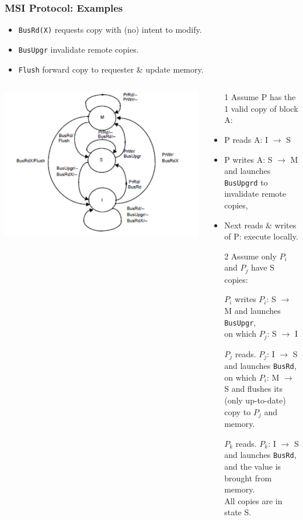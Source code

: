 \documentclass{beamer}
\renewcommand{\emph}[1]{\textcolor{structure}{#1}}
\begin{document}
\begin{frame}[fragile,t]
\frametitle{MSI Protocol: Examples}

\begin{itemize}
    \item \emph{\tt BusRd(X)} requests copy with (no) intent to modify.
    \item \emph{\tt BusUpgr} invalidate remote copies.  
    \item \emph{\tt Flush} forward copy to requester \& update memory.
\end{itemize} 


\begin{columns}\hspace{-7ex}
\includegraphics[width=40ex]{FigsInfCoherence/MSI}
\begin{scriptsize}
\begin{itemize}
    \item[1] \emph{Assume P has the 1 valid copy of block A:}
    \item P reads A: I $\rightarrow$ S
    \item P writes A: S $\rightarrow$ M and launches {\tt BusUpgrd} to invalidate remote copies,  
    \item Next reads \& writes of P: execute locally.\medskip

    \item[2] \emph{Assume only $P_i$ and $P_j$ have S copies:}
    \item[$P_i$ writes] $P_i$: S $\rightarrow$ M and launches {\tt BusUpgr},\\
                        on which $P_j$: S $\rightarrow$ I
    \item[$P_j$ reads.]  $P_j$: I $\rightarrow$ S and launches {\tt BusRd},\\
                         on which $P_i$: M $\rightarrow$ S and flushes its\\
                        (only up-to-date) copy to $P_j$ and memory.
    \item[$P_k$ reads.] $P_k$: I $\rightarrow$ S and launches {\tt BusRd},\\
                        and the value is brought from memory.\\ 
                        All copies are in state S.
\end{itemize}
\end{scriptsize}
\end{columns}

\end{frame}
\end{document}

